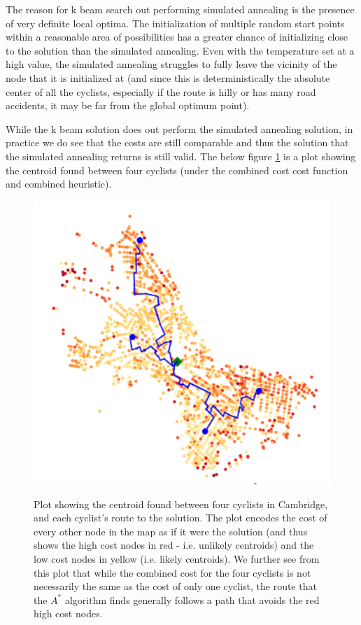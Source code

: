 \documentclass[11pt]{article}
\begin{document}
The reason for k beam search out performing simulated annealing is the presence of very definite local optima. The initialization of multiple random start points within a reasonable area of possibilities has a greater chance of initializing close to the solution than the simulated annealing. Even with the temperature set at a high value, the simulated annealing struggles to fully leave the vicinity of the node that it is initialized at (and since this is deterministically the absolute center of all the cyclists, especially if the route is hilly or has many road accidents, it may be far from the global optimum point).
\par
While the k beam solution does out perform the simulated annealing solution, in practice we do see that the costs are still comparable and thus the solution that the simulated annealing returns is still valid. The below figure \ref{overall_plot} is a plot showing the centroid found between four cyclists (under the combined cost cost function and combined heuristic).

\begin{figure}[H]
\caption{Plot showing the centroid found between four cyclists in Cambridge, and each cyclist's route to the solution. The plot encodes the cost of every other node in the map as if it were the solution (and thus shows the high cost nodes in red - i.e. unlikely centroids) and the low cost nodes in yellow (i.e. likely centroids). We further see from this plot that while the combined cost for the four cyclists is not necessarily the same as the cost of only one cyclist, the route that the $A^{*}$ algorithm finds generally follows a path that avoids the red high cost nodes.}
\includegraphics[width=1\textwidth]{../images/overall_plot.png}
\label{overall_plot}
\end{figure}
\end{document}

